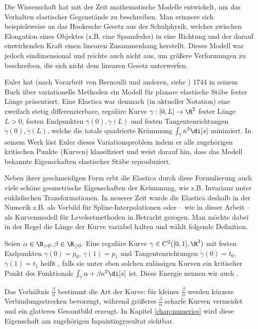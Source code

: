 \documentclass{mythesis}
\begin{document}
Die Wissenschaft hat mit der Zeit mathematische Modelle entwickelt, um das Verhalten elastischer Gegenstände zu beschreiben.
Man erinnere sich beispielsweise an das Hookesche Gesetz aus der Schulphysik, welches zwischen Elongation eines Objektes (z.B. eine Spannfeder) in eine Richtung und der darauf einwirkenden Kraft einen linearen Zusammenhang herstellt.
Dieses Modell war jedoch eindimensional und reichte auch nicht aus, um größere Verformungen zu beschreiben, die sich nicht dem linearen Gesetz unterwerfen.

Euler hat (nach Vorarbeit von Bernoulli und anderen, siehe \cite{levien2008elastica}) 1744 in seinem Buch über variationelle Methoden \cite{euler1774methodus} ein Modell für planare elastische Stäbe fester Länge präsentiert.
Eine Elastica war demnach (in aktueller Notation) eine zweifach stetig differenzierbare, reguläre Kurve $\gamma: [0,L] \to \R^2$ fester Länge $L > 0$, festen Endpunkten $\gamma(0), \gamma(L)$ und festen Tangentenrichtungen $\dot \gamma(0), \dot \gamma(L)$, welche die totale quadrierte Krümmung
\begin{math}
    \int_\gamma \kappa^2 \di[s]
\end{math}
minimiert.
In seinem Werk löst Euler dieses Variationsproblem indem er alle zugehörigen kritischen Punkte (Kurven) klassifiziert und weist darauf hin, dass das Modell bekannte Eigenschaften elastischer Stäbe reproduziert.

Neben ihrer geschmeidigen Form erbt die Elastica durch diese Formulierung auch viele schöne geometrische Eigenschaften der Krümmung, wie z.B. Invarianz unter euklidischen Transformationen.
In neuerer Zeit wurde die Elastica deshalb in der Numerik z.B. als Vorbild für Spline-Interpolationen oder – wie in dieser Arbeit – als Kurvenmodell für Levelsetmethoden in Betracht gezogen.
Man möchte dabei in der Regel die Länge der Kurve variabel halten und wählt folgende Definition.

\begin{definition} \label{definition:elastica}
    Seien $\alpha \in \R_{>0}, \beta \in \R_{\ge 0}$.
    Eine reguläre Kurve $\gamma \in C^2([0,1], \R^2)$ mit festen Endpunkten $\gamma(0) = p_0$, $\gamma(1) = p_1$ und Tangentenrichtungen $\dot\gamma(0) = t_0$, $\dot\gamma(1) = t_1$ heißt , falls sie unter eben solchen zulässigen Kurven ein kritischer Punkt des Funktionals
    \begin{math}
	\int_\gamma \alpha + \beta \kappa^2 \di[s]
    \end{math}
    ist.
    Diese Energie nennen wir auch .
    \begin{note}
	Das Verhältnis $\frac{\beta}{\alpha}$ bestimmt die Art der Kurve: für kleines $\frac{\beta}{\alpha}$ werden kürzere Verbindungsstrecken bevorzugt, während größeres $\frac{\beta}{\alpha}$ scharfe Kurven vermeidet und ein glatteres Gesamtbild erzeugt.
	In Kapitel \ref{chap:numerics} wird diese Eigenschaft am zugehörigen Inpaintingresultat sichtbar.
    \end{note}
\end{definition}
\end{document}
